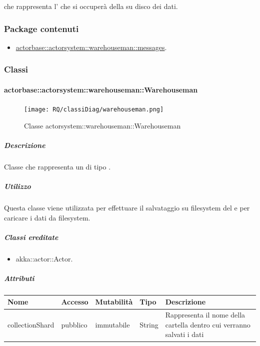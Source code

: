 \documentclass{scalatekids-article}
\begin{document}
 che rappresenta l' che si occuperà della
 su disco dei dati.

\subsubsection{Package contenuti}

\begin{itemize}

\item \hyperref[sec:actorbase::actorsystem::warehouseman::messages]{actorbase::actorsystem::warehouseman::messages}.

\end{itemize}

\subsubsection{Classi}

\paragraph{actorbase::actorsystem::warehouseman::Warehouseman}
\label{sec:actorbase::actorsystem::warehouseman::Warehouseman}

\begin{figure}[H]
  \begin{center}
    \texttt{[image: RQ/classiDiag/warehouseman.png]}
    \caption{Classe actorsystem::warehouseman::Warehouseman}
  \end{center}
\end{figure}

\subparagraph{Descrizione}
Classe che rappresenta un  di tipo .

\subparagraph{Utilizzo}
Questa classe viene utilizzata per effettuare il salvataggio su filesystem del
 e per caricare i dati da filesystem.

\subparagraph{Classi ereditate}

\begin{itemize}

\item akka::actor::Actor.

\end{itemize}

\subparagraph{Attributi}
\begin{tabular}{| p{3cm} | p{1.5cm} | p{2cm} | p{2cm} | p{8.5cm} |}
  \hline
  Nome & Accesso & Mutabilità & Tipo & Descrizione\\
  \hline
  collectionShard & pubblico & immutabile & String & Rappresenta il nome della cartella dentro cui verranno salvati i dati \\
  \hline
\end{tabular}
\end{document}
